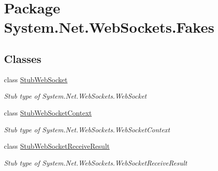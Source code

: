 \hypertarget{namespace_system_1_1_net_1_1_web_sockets_1_1_fakes}{\section{Package System.\-Net.\-Web\-Sockets.\-Fakes}
\label{namespace_system_1_1_net_1_1_web_sockets_1_1_fakes}
}
\subsection*{Classes}
\begin{DoxyCompactItemize}
\item 
class \hyperlink{class_system_1_1_net_1_1_web_sockets_1_1_fakes_1_1_stub_web_socket}{Stub\-Web\-Socket}
\begin{DoxyCompactList}\small\item\em Stub type of System.\-Net.\-Web\-Sockets.\-Web\-Socket\end{DoxyCompactList}\item 
class \hyperlink{class_system_1_1_net_1_1_web_sockets_1_1_fakes_1_1_stub_web_socket_context}{Stub\-Web\-Socket\-Context}
\begin{DoxyCompactList}\small\item\em Stub type of System.\-Net.\-Web\-Sockets.\-Web\-Socket\-Context\end{DoxyCompactList}\item 
class \hyperlink{class_system_1_1_net_1_1_web_sockets_1_1_fakes_1_1_stub_web_socket_receive_result}{Stub\-Web\-Socket\-Receive\-Result}
\begin{DoxyCompactList}\small\item\em Stub type of System.\-Net.\-Web\-Sockets.\-Web\-Socket\-Receive\-Result\end{DoxyCompactList}\end{DoxyCompactItemize}
